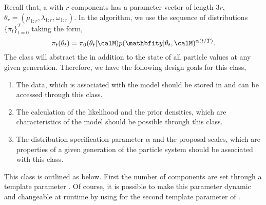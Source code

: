 Recall that, a \gmm with $r$ components has a parameter vector of length $3r$,
$\theta_r = (\mu_{1:r}, \lambda_{1:r}, \omega_{1:r})$. In the \smc[2]
algorithm, we use the sequence of distributions $\{\pi_t\}_{t=0}^T$ taking the
form,
\begin{equation*}
  \pi_t(\theta_t) =
  \pi_0(\theta_t|\calM) p(\data|\theta_t,\calM)^{\alpha(t/T)}.
\end{equation*}
The  class will abstract the \gmm in addition to the state of
all particle values at any given generation. Therefore, we have the following
design goals for this class,
\begin{enumerate}
  \item The data, which is associated with the model should be stored in and
    can be accessed through this class.
  \item The calculation of the likelihood and the prior densities, which are
    characteristics of the model should be possible through this class.
  \item The distribution specification parameter $\alpha$ and the \mcmc
    proposal scales, which are properties of a given generation of the
    particle system should be associated with this class.
\end{enumerate}
This class is outlined as below.
First the number of components are set through a template parameter
. Of course, it is possible to make this parameter dynamic and
changeable at runtime by using  for the second template
parameter of .

